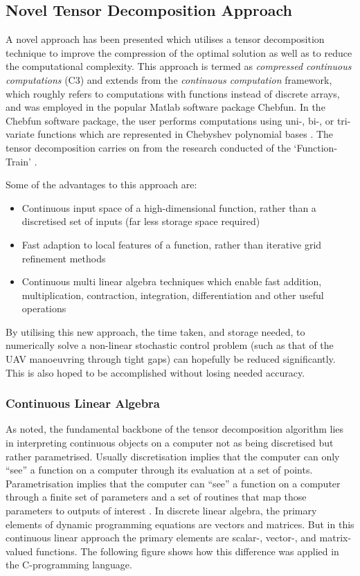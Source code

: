 \documentclass[11pt,draftd]{article}
\begin{document}
\subsection{Novel Tensor Decomposition Approach}
A novel approach has been presented which utilises a tensor decomposition technique to improve the compression of the optimal solution as well as to reduce the computational complexity. This approach is termed as \textit{compressed continuous computations} (C3) and extends from the \textit{continuous computation} framework, which roughly refers to computations with functions instead of discrete arrays, and was employed in the popular Matlab software package Chebfun. In the Chebfun software package, the user performs computations using uni-, bi-, or tri-variate functions which are represented in Chebyshev polynomial bases \cite{chebfun}. The tensor decomposition carries on from the research conducted of the ‘Function-Train’ \cite{ft-alex}.

Some of the advantages to this approach are:
\begin{itemize}
	\item Continuous input space of a high-dimensional function, rather than a discretised set of inputs (far less storage space required)
	\item Fast adaption to local features of a function, rather than iterative grid refinement methods
	\item Continuous multi linear algebra techniques which enable fast addition, multiplication, contraction, integration, differentiation and other useful operations
\end{itemize}
By utilising this new approach, the time taken, and storage needed, to numerically solve a non-linear stochastic control problem (such as that of the UAV manoeuvring through tight gaps) can hopefully be reduced significantly. This is also hoped to be accomplished without losing needed accuracy.\\

\subsubsection{Continuous Linear Algebra}
As noted, the fundamental backbone of the tensor decomposition algorithm lies in interpreting continuous objects on a computer not as being discretised but rather parametrised. Usually discretisation implies that the computer can only “see” a function on a computer through its evaluation at a set of points. Parametrisation implies that the computer can “see” a function on a computer through a finite set of parameters and a set of routines that map those parameters to outputs of interest \cite{thesis}. In discrete linear algebra, the primary elements of dynamic programming equations are vectors and matrices. But in this continuous linear approach the primary elements are scalar-, vector-, and matrix-valued functions. The following figure shows how this difference was applied in the C-programming language.
\end{document}
